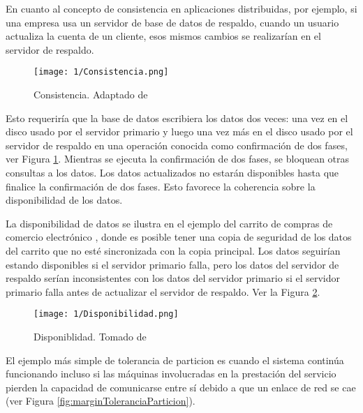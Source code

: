  En cuanto al concepto de \gls{consistencia}  en aplicaciones distribuidas, por ejemplo, si una empresa usa un servidor de base de datos de respaldo, cuando un usuario actualiza la cuenta de un cliente, esos mismos cambios se realizar\'ian en el servidor de respaldo.

\begin{figure} %
			\begin{center}
	\texttt{[image: 1/Consistencia.png]}
	\caption{Consistencia. Adaptado  de \cite{Sullivan2015} }
	\label{fig:marginCP}
			\end{center}
\end{figure}




Esto requeriría que la base de datos escribiera los datos dos veces: una vez en el disco usado por el servidor primario y luego una vez más en el disco usado por el servidor de respaldo en una operación conocida como confirmación de dos fases, ver Figura \ref{fig:marginCP}. 
Mientras se ejecuta la confirmación de dos fases, se bloquean otras consultas a los datos. Los datos actualizados no estarán disponibles hasta que finalice la confirmación de dos fases. Esto favorece la coherencia sobre la disponibilidad de los datos.


La \gls{disponibilidad} de datos se ilustra en el ejemplo del carrito de compras de comercio electr\'onico \cite{Sullivan2015}, 
donde es posible tener una copia de seguridad de los datos del carrito que no est\'e sincronizada con la copia principal. Los datos seguir\'ian estando disponibles si el servidor primario falla, pero los datos del servidor de respaldo ser\'ian inconsistentes con los datos del servidor primario si el servidor primario falla antes de actualizar el servidor de respaldo.  Ver la Figura \ref{fig:marginAP}.


\begin{figure}%
			\begin{center}
	\texttt{[image: 1/Disponibilidad.png]}
	\caption{Disponiblidad. Tomado de \cite{Sullivan2015} }
	\label{fig:marginAP}
			\end{center}
\end{figure}

El ejemplo m\'as simple de \gls{tolerancia de particion} es cuando el sistema continúa funcionando incluso si las máquinas involucradas en la prestación del servicio pierden la capacidad de comunicarse entre sí debido a que un enlace de red se cae (ver  Figura \ref{fig:marginToleranciaParticion}).

